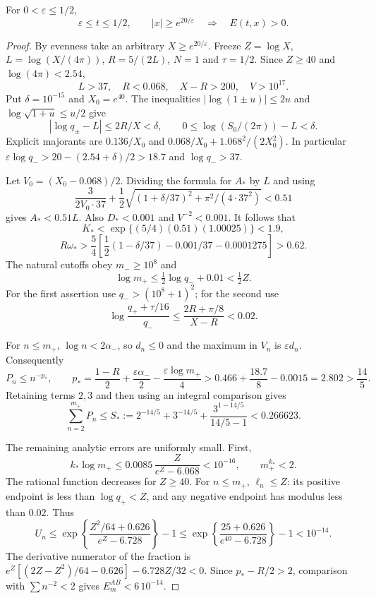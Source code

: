 \begin{theorem}\label{thm:outer20}
For $0<\varepsilon\le1/2$,
\begin{equation}\label{eq:outer20}
 \varepsilon\le t\le1/2,\qquad |x|\ge e^{20/\varepsilon}
 \quad\Longrightarrow\quad E(t,x)>0.
\end{equation}
\end{theorem}
\begin{proof}
By evenness take an arbitrary $X\ge e^{20/\varepsilon}$.
Freeze $Z=\log X$, $L=\log(X/(4\pi))$, $R=5/(2L)$,
$N=1$ and $\tau=1/2$. Since $Z\ge40$ and $\log(4\pi)<2.54$,
\[
 L>37,\quad R<0.068,\quad X-R>200,\quad V>10^{17}.
\]
Put $\delta=10^{-15}$ and $X_0=e^{40}$. The inequalities
$|\log(1\pm u)|\le2u$ and $\log\sqrt{1+u}\le u/2$ give
\[
 |\log q_\pm-L|\le2R/X<\delta,\qquad
 0\le\log(S_0/(2\pi))-L<\delta.
\]
Explicit majorants are $0.136/X_0$ and
$0.068/X_0+1.068^2/(2X_0^2)$.
In particular
$\varepsilon\log q_->20-(2.54+\delta)/2>18.7$ and $\log q_->37$.

Let $V_0=(X_0-0.068)/2$. Dividing the formula for $A_*$ by $L$
and using
\[
 \frac3{2V_0\cdot37}+
 \frac12\sqrt{(1+\delta/37)^2+\pi^2/(4\cdot37^2)}<0.51
\]
gives $A_*<0.51L$. Also $D_*<0.001$ and $V^{-2}<0.001$.
It follows that
\[
 K_*<\exp\{(5/4)(0.51)(1.00025)\}<1.9,
\]
\[
 R\omega_*>
 \frac54\left[\frac12(1-\delta/37)-0.001/37-0.0001275\right]>0.62.
\]
The natural cutoffs obey $m_-\ge10^8$ and
\[
 \log m_+\le\tfrac12\log q_-+0.01<\tfrac12 Z.
\]
For the first assertion use $q_->(10^8+1)^2$; for the second use
\[
 \log\frac{q_++\tau/16}{q_-}
 \le\frac{2R+\pi/8}{X-R}<0.02.
\]

For $n\le m_+$, $\log n<2\alpha_-$, so $d_n\le0$ and the maximum
in $V_n$ is $\varepsilon d_n$. Consequently
\[
 P_n\le n^{-p_*},\qquad
 p_*=\frac{1-R}{2}+\frac{\varepsilon\alpha_-}{2}
                  -\frac{\varepsilon\log m_+}{4}
 >0.466+\frac{18.7}{8}-0.0015=2.802>\frac{14}5 .
\]
Retaining terms $2,3$ and then using an integral comparison gives
\begin{equation}\label{eq:outer-sum}
 \sum_{n=2}^{m_+}P_n\le
 S_*:=2^{-14/5}+3^{-14/5}
       +\frac{3^{1-14/5}}{14/5-1}<0.266623.
\end{equation}

The remaining analytic errors are uniformly small. First,
\[
 k_*\log m_+\le0.0085\,\frac{Z}{e^Z-6.068}<10^{-16},
 \qquad m_+^{k_*}<2.
\]
The rational function decreases for $Z\ge40$. For $n\le m_+$,
$\ell_n\le Z$: its positive endpoint is less than $\log q_+<Z$,
and any negative endpoint has modulus less than $0.02$.
Thus
\[
 U_n\le\exp\left\{\frac{Z^2/64+0.626}{e^Z-6.728}\right\}-1
 \le\exp\left\{\frac{25+0.626}{e^{40}-6.728}\right\}-1<10^{-14}.
\]
The derivative numerator of the fraction is
$e^Z[(2Z-Z^2)/64-0.626]-6.728Z/32<0$.
Since $p_*-R/2>2$, comparison with $\sum n^{-2}<2$ gives
$E_m^{AB}<6\,10^{-14}$.


\end{proof}
